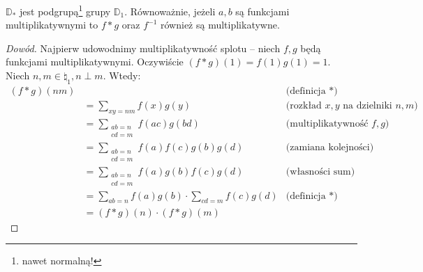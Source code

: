 \begin{theorem}
	\label{nt:dirichletmulti}
	$\mathbb D_*$ jest podgrupą\footnote{nawet normalną!} grupy $\mathbb D_1$.
	Równoważnie, jeżeli $a, b$ są funkcjami multiplikatywnymi to
	$f * g$ oraz $f^{-1}$ również są multiplikatywne.
\end{theorem}
\begin{proof}[Dowód]
	Najpierw udowodnimy multiplikatywność splotu -- niech $f, g$ będą funkcjami multiplikatywnymi.
	Oczywiście $(f * g)(1) = f(1)g(1) = 1$.
	Niech $n,m \in \natural_1, n \perp m$. Wtedy:
	\begin{align*}
		(f*g)(nm) &                                                                                                                      & \text{(definicja $*$)}                      \\
		          & = \sum_{xy = nm} f(x)g(y)                                                                                            & \text{(rozkład $x, y$ na dzielniki $n, m$)} \\
		          & = \sum_{                                                                                            \substack{ab = n                                               \\ cd = m}} f(ac)g(bd)                    & \text{(multiplikatywność $f, g$)}           \\
		          & = \sum_{                                                                                            \substack{ab = n                                               \\ cd = m}} f(a)f(c)g(b)g(d)              & \text{(zamiana kolejności)}                 \\
		          & = \sum_{                                                                                            \substack{ab = n                                               \\ cd = m}} f(a)g(b)f(c)g(d)              & \text{(własności sum)}                      \\
		          & = \sum_{ab = n} f(a)g(b) \cdot \sum_{cd = m} f(c)g(d)                                                                & \text{(definicja $*$)}                      \\
		          & = (f*g)(n) \cdot (f*g)(m)
	\end{align*}


\end{proof}
